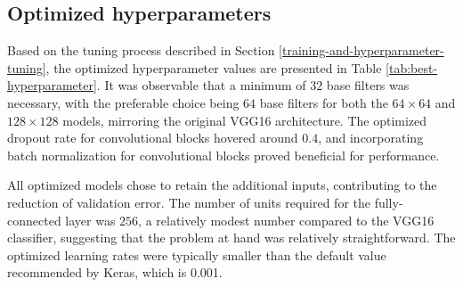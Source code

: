 \documentclass[]{interact}
\theoremstyle{plain}%
\theoremstyle{definition}
\theoremstyle{remark}
\begin{document}
\hypertarget{optimized-hyperparameters}{%
\subsection{Optimized hyperparameters}\label{optimized-hyperparameters}}

Based on the tuning process described in Section
\ref{training-and-hyperparameter-tuning}, the optimized hyperparameter
values are presented in Table \ref{tab:best-hyperparameter}. It was
observable that a minimum of \(32\) base filters was necessary, with the
preferable choice being \(64\) base filters for both the
\(64 \times 64\) and \(128 \times 128\) models, mirroring the original
VGG16 architecture. The optimized dropout rate for convolutional blocks
hovered around \(0.4\), and incorporating batch normalization for
convolutional blocks proved beneficial for performance.

All optimized models chose to retain the additional inputs, contributing
to the reduction of validation error. The number of units required for
the fully-connected layer was \(256\), a relatively modest number
compared to the VGG16 classifier, suggesting that the problem at hand
was relatively straightforward. The optimized learning rates were
typically smaller than the default value recommended by Keras, which is
0.001.

\begin{table}

\caption{\label{tab:best-hyperparameter}Hyperparameters values for the optimized computer vision models with different input sizes.}
\centering
{}
\end{table}
\end{document}
